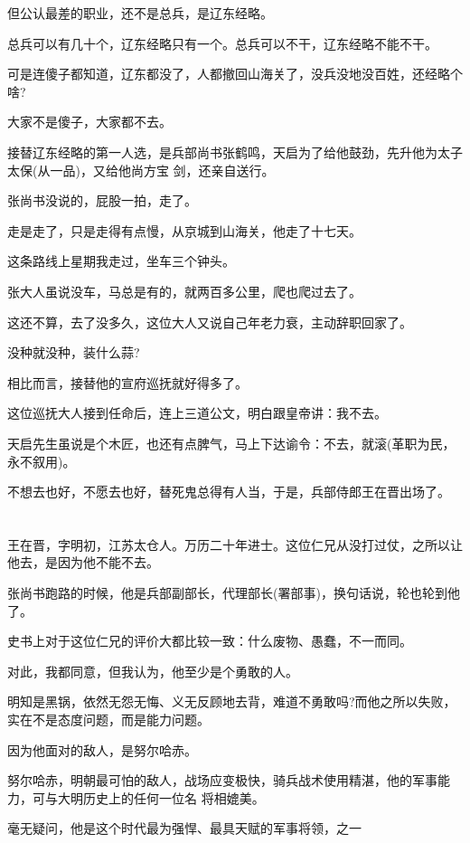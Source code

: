 \documentclass[11pt,a4paper,onecolumn]{article}
\begin{document}
但公认最差的职业，还不是总兵，是辽东经略。

总兵可以有几十个，辽东经略只有一个。总兵可以不干，辽东经略不能不干。

可是连傻子都知道，辽东都没了，人都撤回山海关了，没兵没地没百姓，还经略个啥?

大家不是傻子，大家都不去。

接替辽东经略的第一人选，是兵部尚书张鹤鸣，天启为了给他鼓劲，先升他为太子太保(从一品)，又给他尚方宝
剑，还亲自送行。

张尚书没说的，屁股一拍，走了。

走是走了，只是走得有点慢，从京城到山海关，他走了十七天。

这条路线上星期我走过，坐车三个钟头。

张大人虽说没车，马总是有的，就两百多公里，爬也爬过去了。

这还不算，去了没多久，这位大人又说自己年老力衰，主动辞职回家了。

没种就没种，装什么蒜?

相比而言，接替他的宣府巡抚就好得多了。

这位巡抚大人接到任命后，连上三道公文，明白跟皇帝讲：我不去。

天启先生虽说是个木匠，也还有点脾气，马上下达谕令：不去，就滚(革职为民，永不叙用)。

不想去也好，不愿去也好，替死鬼总得有人当，于是，兵部侍郎王在晋出场了。

\section[\thesection]{}

王在晋，字明初，江苏太仓人。万历二十年进士。这位仁兄从没打过仗，之所以让他去，是因为他不能不去。

张尚书跑路的时候，他是兵部副部长，代理部长(署部事)，换句话说，轮也轮到他了。

史书上对于这位仁兄的评价大都比较一致：什么废物、愚蠢，不一而同。

对此，我都同意，但我认为，他至少是个勇敢的人。

明知是黑锅，依然无怨无悔、义无反顾地去背，难道不勇敢吗?而他之所以失败，实在不是态度问题，而是能力问题。

因为他面对的敌人，是努尔哈赤。

努尔哈赤，明朝最可怕的敌人，战场应变极快，骑兵战术使用精湛，他的军事能力，可与大明历史上的任何一位名
将相媲美。

毫无疑问，他是这个时代最为强悍、最具天赋的军事将领，之一
\end{document}
